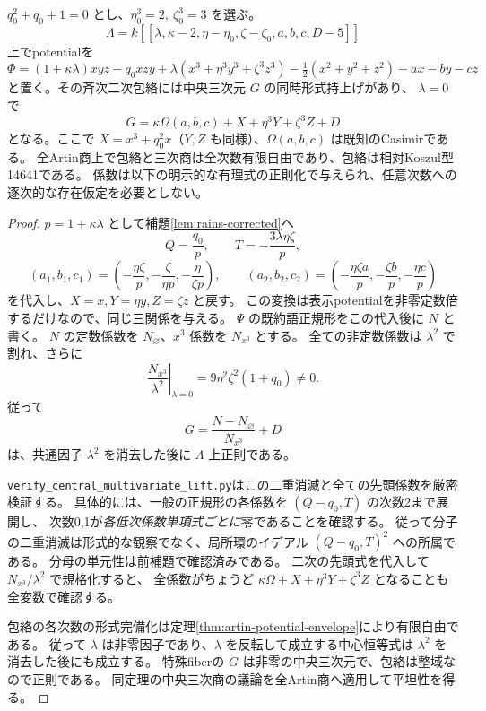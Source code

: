 \begin{theorem}[八変数の全次数平坦な中心切断形式族]
\label{thm:eight-formal-central-lift}
$q_0^2+q_0+1=0$ とし、$\eta_0^3=2,\ \zeta_0^3=3$ を選ぶ。
\[
 \Lambda=k[[\lambda,\kappa-2,\eta-\eta_0,\zeta-\zeta_0,a,b,c,D-5]]
\]
上でpotentialを
\[
 \Phi=(1+\kappa\lambda)xyz-q_0xzy+
 \lambda(x^3+\eta^3y^3+\zeta^3z^3)
 -\tfrac12(x^2+y^2+z^2)-ax-by-cz
\]
と置く。その斉次二次包絡には中央三次元 $G$ の同時形式持上げがあり、
$\lambda=0$ で
\[
 G=\kappa\Omega(a,b,c)+X+\eta^3Y+\zeta^3Z+D
\]
となる。ここで $X=x^3+q_0^2x$（$Y,Z$ も同様）、$\Omega(a,b,c)$ は既知のCasimirである。
全Artin商上で包絡と三次商は全次数有限自由であり、包絡は相対Koszul型14641である。
係数は以下の明示的な有理式の正則化で与えられ、任意次数への逐次的な存在仮定を必要としない。
\end{theorem}
\begin{proof}
$p=1+\kappa\lambda$ として補題\ref{lem:rains-corrected}へ
\[
 Q=\frac{q_0}{p},\qquad T=-\frac{3\lambda\eta\zeta}{p},
\]
\[
 (a_1,b_1,c_1)=\left(-\frac{\eta\zeta}{p},-\frac{\zeta}{\eta p},-\frac{\eta}{\zeta p}\right),
 \qquad
 (a_2,b_2,c_2)=\left(-\frac{\eta\zeta a}{p},-\frac{\zeta b}{p},-\frac{\eta c}{p}\right)
\]
を代入し、$X=x,Y=\eta y,Z=\zeta z$ と戻す。
この変換は表示potentialを非零定数倍するだけなので、同じ三関係を与える。
$\Psi$ の既約語正規形をこの代入後に $N$ と書く。
$N$ の定数係数を $N_\varnothing$、$x^3$ 係数を $N_{x^3}$ とする。
全ての非定数係数は $\lambda^2$ で割れ、さらに
\[
 \left.\frac{N_{x^3}}{\lambda^2}\right|_{\lambda=0}
   =9\eta^2\zeta^2(1+q_0)\ne0.
\]
従って
\[
 G=\frac{N-N_\varnothing}{N_{x^3}}+D
\]
は、共通因子 $\lambda^2$ を消去した後に $\Lambda$ 上正則である。

\texttt{verify\_central\_multivariate\_lift.py}はこの二重消滅と全ての先頭係数を厳密検証する。
具体的には、一般の正規形の各係数を $(Q-q_0,T)$ の次数2まで展開し、
次数0,1が\emph{各低次係数単項式ごとに}零であることを確認する。
従って分子の二重消滅は形式的な観察でなく、局所環のイデアル $(Q-q_0,T)^2$ への所属である。
分母の単元性は前補題で確認済みである。
二次の先頭式を代入して $N_{x^3}/\lambda^2$ で規格化すると、
全係数がちょうど $\kappa\Omega+X+\eta^3Y+\zeta^3Z$ となることも全変数で確認する。

包絡の各次数の形式完備化は定理\ref{thm:artin-potential-envelope}により有限自由である。
従って $\lambda$ は非零因子であり、$\lambda$ を反転して成立する中心恒等式は
$\lambda^2$ を消去した後にも成立する。
特殊fiberの $G$ は非零の中央三次元で、包絡は整域なので正則である。
同定理の中央三次商の議論を全Artin商へ適用して平坦性を得る。
\end{proof}

